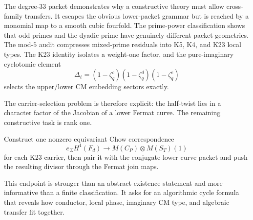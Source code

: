 \documentclass[11pt,oneside]{book}
\theoremstyle{definition}
\theoremstyle{remark}
\begin{document}
The degree-$33$ packet demonstrates why a constructive theory must allow cross-family transfers. It escapes the obvious lower-packet grammar but is reached by a monomial map to a smooth cubic fourfold. The prime-power classification shows that odd primes and the dyadic prime have genuinely different packet geometries. The mod-$5$ audit compresses mixed-prime residuals into K5, K4, and K23 local types. The K23 identity isolates a weight-one factor, and the pure-imaginary cyclotomic element
\[
\Delta_\ell=(1-\zeta_q^c)(1-\zeta_q^d)(1-\zeta_q^e)
\]
selects the upper/lower CM embedding sectors exactly.

The carrier-selection problem is therefore explicit: the half-twist lies in a character factor of the Jacobian of a lower Fermat curve. The remaining constructive task is rank one.

\begin{resultbox}
Construct one nonzero equivariant Chow correspondence
\[
e_{\Sigma}H^1(F_d)
\longrightarrow
M(C_P)\otimes M(S_T)(1)
\]
for each K23 carrier, then pair it with the conjugate lower curve packet and push the resulting divisor through the Fermat join maps.
\end{resultbox}

This endpoint is stronger than an abstract existence statement and more informative than a finite classification. It asks for an algorithmic cycle formula that reveals how conductor, local phase, imaginary CM type, and algebraic transfer fit together.



\appendix
\end{document}
